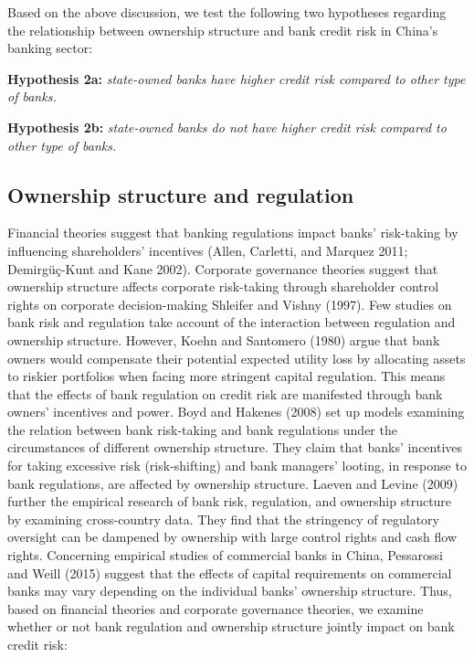 \documentclass{article}
\begin{document}
Based on the above discussion, we test the following two hypotheses
regarding the relationship between ownership structure and bank credit
risk in China's banking sector:

\textbf{Hypothesis 2a:} \emph{state-owned banks have higher credit risk
compared to other type of banks.}

\textbf{Hypothesis 2b:} \emph{state-owned banks do not have higher
credit risk compared to other type of banks.}

\hypertarget{ownership-structure-and-regulation}{%
\subsection{Ownership structure and
regulation}\label{ownership-structure-and-regulation}}

Financial theories suggest that banking regulations impact banks'
risk-taking by influencing shareholders' incentives (Allen, Carletti,
and Marquez 2011; Demirgüç-Kunt and Kane 2002). Corporate governance
theories suggest that ownership structure affects corporate risk-taking
through shareholder control rights on corporate decision-making Shleifer
and Vishny (1997). Few studies on bank risk and regulation take account
of the interaction between regulation and ownership structure. However,
Koehn and Santomero (1980) argue that bank owners would compensate their
potential expected utility loss by allocating assets to riskier
portfolios when facing more stringent capital regulation. This means
that the effects of bank regulation on credit risk are manifested
through bank owners' incentives and power. Boyd and Hakenes (2008) set
up models examining the relation between bank risk-taking and bank
regulations under the circumstances of different ownership structure.
They claim that banks' incentives for taking excessive risk
(risk-shifting) and bank managers' looting, in response to bank
regulations, are affected by ownership structure. Laeven and Levine
(2009) further the empirical research of bank risk, regulation, and
ownership structure by examining cross-country data. They find that the
stringency of regulatory oversight can be dampened by ownership with
large control rights and cash flow rights. Concerning empirical studies
of commercial banks in China, Pessarossi and Weill (2015) suggest that
the effects of capital requirements on commercial banks may vary
depending on the individual banks' ownership structure. Thus, based on
financial theories and corporate governance theories, we examine whether
or not bank regulation and ownership structure jointly impact on bank
credit risk:
\end{document}
